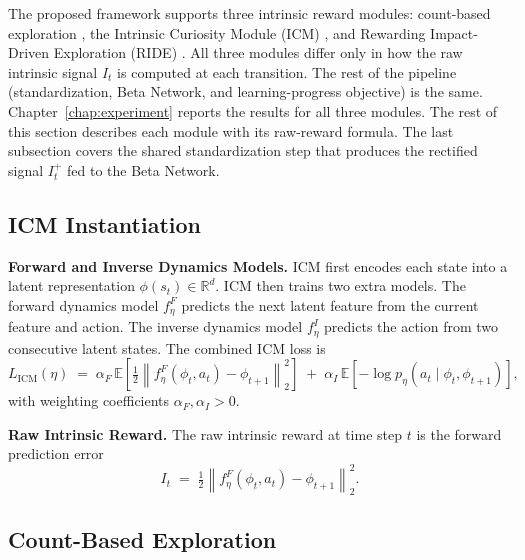 The proposed framework supports three intrinsic reward modules: count-based exploration \cite{bellemare2016count, tang2017exploration}, the Intrinsic Curiosity Module (ICM) \cite{pathak2017curiosity}, and Rewarding Impact-Driven Exploration (RIDE) \cite{raileanu2020ride}. All three modules differ only in how the raw intrinsic signal $I_t$ is computed at each transition. The rest of the pipeline (standardization, Beta Network, and learning-progress objective) is the same. Chapter~\ref{chap:experiment} reports the results for all three modules. The rest of this section describes each module with its raw-reward formula. The last subsection covers the shared standardization step that produces the rectified signal $I_t^+$ fed to the Beta Network.

\subsection{ICM Instantiation}
\label{sec:icm}

\textbf{Forward and Inverse Dynamics Models.} ICM first encodes each state into a latent representation $\phi(s_t) \in \mathbb{R}^d$. ICM then trains two extra models. The forward dynamics model $f^F_\eta$ predicts the next latent feature from the current feature and action. The inverse dynamics model $f^I_\eta$ predicts the action from two consecutive latent states. The combined ICM loss is
\begin{equation}
L_\text{ICM}(\eta) \;=\;
\alpha_F \, \mathbb{E}\!\left[\tfrac{1}{2}\!\left\| f^F_\eta(\phi_t, a_t) - \phi_{t+1} \right\|_2^2\right]
\;+\; \alpha_I \, \mathbb{E}\!\left[ -\log p_\eta(a_t \mid \phi_t, \phi_{t+1}) \right],
\label{eq:icm_loss}
\end{equation}
with weighting coefficients $\alpha_F, \alpha_I > 0$.

\textbf{Raw Intrinsic Reward.} The raw intrinsic reward at time step $t$ is the forward prediction error
\begin{equation}
I_t \;=\; \tfrac{1}{2}\!\left\| f^F_\eta(\phi_t, a_t) - \phi_{t+1} \right\|_2^2.
\label{eq:icm_raw}
\end{equation}

\subsection{Count-Based Exploration}
\label{sec:count_module}

